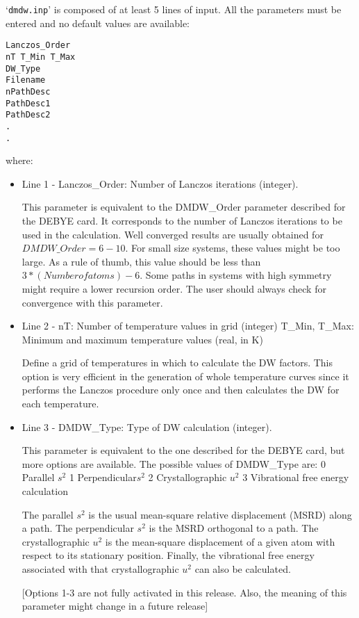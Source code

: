 \documentclass[11pt,oneside]{report} %
\newcommand{\file}[1]{`\texttt{#1}'}
\begin{document}
\begin{latexonly}
\file{dmdw.inp} is composed of at least 5 lines of input.  All the
parameters must be entered and no default values are available:
\begin{verbatim}
Lanczos_Order
nT T_Min T_Max
DW_Type
Filename
nPathDesc
PathDesc1
PathDesc2
.
.
\end{verbatim}
where:
\begin{itemize}
\item Line  1 - Lanczos\_Order: Number of Lanczos iterations (integer).

  This parameter is equivalent to the DMDW\_Order parameter described for
  the DEBYE card. It corresponds to the number of Lanczos iterations to be used
  in the calculation. Well converged results are usually obtained for
  $DMDW\_Order=6-10$. For small size systems, these values might be too large. As a
  rule of thumb, this value should be less than $3*(Number of atoms)-6$. Some
  paths in systems with high symmetry might require a lower recursion
  order. The user should always check for convergence with this parameter.

\item Line  2 - nT: Number of temperature values in grid (integer)
          T\_Min, T\_Max: Minimum and maximum temperature values (real, in K)

  Define a grid of temperatures in which to calculate the DW factors. This
  option is very efficient in the generation of whole temperature curves since
  it performs the Lanczos procedure only once and then calculates the DW for
  each temperature.

\item Line  3 - DMDW\_Type: Type of DW calculation (integer).

  This parameter is equivalent to the one described for the DEBYE card,
  but more options are available.
  The possible values of DMDW\_Type are:
	0	Parallel $s^{2}$
	1	Perpendicular$s^{2}$
	2	Crystallographic $u^{2}$
	3	Vibrational free energy calculation
	
  The parallel $s^{2}$ is the usual mean-square relative displacement (MSRD) along a
  path. The perpendicular $s^{2}$ is the MSRD orthogonal to a path. The
  crystallographic $u^{2}$ is the mean-square displacement of a given atom with
  respect to its stationary position. Finally, the vibrational free energy
  associated with that crystallographic $u^{2}$ can also be calculated.

  [Options 1-3 are not fully activated in this release. Also, 
  the meaning of this parameter might change in a future release]


\end{itemize}
\end{latexonly}
\end{document}

